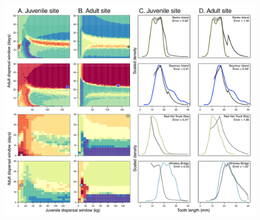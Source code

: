 \documentclass[]{rsos}%
\begin{document}
\begin{figure}[ht]

  \centering
  \includegraphics[width=1\linewidth]{fig_empirical_eocene_comp_all2.pdf}  


\end{figure}
\end{document}
